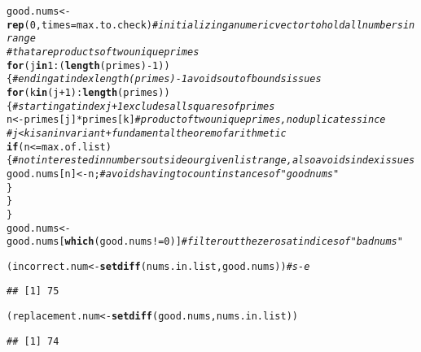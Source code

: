 \documentclass{article}\usepackage[]{graphicx}\usepackage[]{xcolor}
\makeatletter
\newcommand{\hlnum}[1]{\textcolor[rgb]{0.686,0.059,0.569}{#1}}%
\newcommand{\hlcom}[1]{\textcolor[rgb]{0.678,0.584,0.686}{\textit{#1}}}%
\newcommand{\hlopt}[1]{\textcolor[rgb]{0,0,0}{#1}}%
\newcommand{\hldef}[1]{\textcolor[rgb]{0.345,0.345,0.345}{#1}}%
\newcommand{\hlkwa}[1]{\textcolor[rgb]{0.161,0.373,0.58}{\textbf{#1}}}%
\newcommand{\hlkwb}[1]{\textcolor[rgb]{0.69,0.353,0.396}{#1}}%
\newcommand{\hlkwc}[1]{\textcolor[rgb]{0.333,0.667,0.333}{#1}}%
\newcommand{\hlkwd}[1]{\textcolor[rgb]{0.737,0.353,0.396}{\textbf{#1}}}%
\newenvironment{kframe}{%
 \def\at@end@of@kframe{}%
 \ifinner\ifhmode%
  \def\at@end@of@kframe{\end{minipage}}%
  \begin{minipage}{\columnwidth}%
 \fi\fi%
 \def\FrameCommand##1{\hskip\@totalleftmargin \hskip-\fboxsep
 \colorbox{shadecolor}{##1}\hskip-\fboxsep
     \hskip-\linewidth \hskip-\@totalleftmargin \hskip\columnwidth}%
 \MakeFramed {\advance\hsize-\width
   \@totalleftmargin\z@ \linewidth\hsize
   \@setminipage}}%
 {\par\unskip\endMakeFramed%
 \at@end@of@kframe}
\newenvironment{knitrout}{}{} %
\makeatother
\begin{document}
\begin{enumerate}
\begin{knitrout}
\begin{kframe}
\begin{alltt}
\hldef{good.nums} \hlkwb{<-} \hlkwd{rep}\hldef{(}\hlnum{0}\hldef{,}\hlkwc{times} \hldef{= max.to.check)} \hlcom{# initializing a numeric vector to hold all numbers in range }
                                         \hlcom{# that are products of two unique primes}
\hlkwa{for}\hldef{(j} \hlkwa{in} \hlnum{1}\hlopt{:}\hldef{(}\hlkwd{length}\hldef{(primes)}\hlopt{-}\hlnum{1}\hldef{))\{} \hlcom{# ending at index length(primes)-1 avoids out of bounds issues}
  \hlkwa{for}\hldef{(k} \hlkwa{in} \hldef{(j}\hlopt{+}\hlnum{1}\hldef{)}\hlopt{:}\hlkwd{length}\hldef{(primes))\{} \hlcom{# starting at index j+1 excludes all squares of primes}
    \hldef{n} \hlkwb{<-} \hldef{primes[j]}\hlopt{*}\hldef{primes[k]} \hlcom{# product of two unique primes, no duplicates since}
                             \hlcom{# j<k is an invariant + fundamental theorem of arithmetic}
    \hlkwa{if}\hldef{(n} \hlopt{<=} \hldef{max.of.list)\{} \hlcom{# not interested in numbers outside our given list range, also avoids index issues}
      \hldef{good.nums[n]} \hlkwb{<-} \hldef{n;} \hlcom{# avoids having to count instances of "good nums"}
    \hldef{\}}
  \hldef{\}}
\hldef{\}}
\hldef{good.nums} \hlkwb{<-} \hldef{good.nums[}\hlkwd{which}\hldef{(good.nums} \hlopt{!=} \hlnum{0}\hldef{)]} \hlcom{# filter out the zeros at indices of "bad nums"}

\hldef{(incorrect.num} \hlkwb{<-} \hlkwd{setdiff}\hldef{(nums.in.list, good.nums))} \hlcom{# s-e}
\end{alltt}
\begin{verbatim}
## [1] 75
\end{verbatim}
\begin{alltt}
\hldef{(replacement.num} \hlkwb{<-} \hlkwd{setdiff}\hldef{(good.nums, nums.in.list))}
\end{alltt}
\begin{verbatim}
## [1] 74
\end{verbatim}
\end{kframe}
\end{knitrout}
\end{enumerate}


\end{document}
